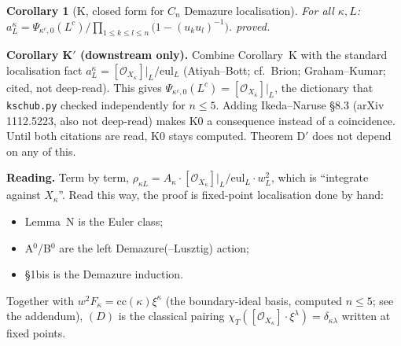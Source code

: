 \documentclass[11pt]{article}
\newcommand{\gr}[1]{\textsf{#1}}
\newcommand{\cc}{\mathrm{cc}}
\newcommand{\eul}{\mathrm{eul}}
\newcommand{\Oc}{\mathcal O}
\newtheorem{corollary}[theorem]{Corollary}
\theoremstyle{remark}
\begin{document}
\begin{corollary}[K, closed form for $C_n$ Demazure localisation]
For all $\kappa,L$: $a^\kappa_L=\Psi_{\kappa^c,0}(L^c)\big/\prod_{1\le k\le l\le n}\bigl(1-(u_ku_l)^{-1}\bigr)$.
\gr{proved}.
\end{corollary}

\textbf{Corollary K$'$ (downstream only).} Combine Corollary~K with the standard localisation fact
$a^\kappa_L=[\Oc_{X_\kappa}]|_L/\eul_L$ (Atiyah--Bott; cf.\ Brion; Graham--Kumar; cited, not deep-read). This gives
$\Psi_{\kappa^c,0}(L^c)=[\Oc_{X_\kappa}]|_L$, the dictionary that \texttt{kschub.py} checked independently for $n\le5$.
Adding Ikeda--Naruse \S8.3 (arXiv 1112.5223, also not deep-read) makes K0 a consequence instead of a coincidence.
Until both citations are read, K0 stays \gr{computed}. Theorem D$'$ does not depend on any of this.

\textbf{Reading.} Term by term, $\rho_{\kappa L}=A_\kappa\cdot[\Oc_{X_\kappa}]|_L/\eul_L\cdot w_L^2$, which is
``integrate against $X_\kappa$''. Read this way, the proof is fixed-point localisation done by hand:
\begin{itemize}[leftmargin=*,itemsep=1pt]
\item Lemma~N is the Euler class;
\item A$^0$/B$^0$ are the left Demazure(--Lusztig) action;
\item \S1bis is the Demazure induction.
\end{itemize}
Together with $w^2F_\kappa=\cc(\kappa)\xi^\kappa$ (the boundary-ideal basis, \gr{computed} $n\le5$; see the addendum),
$(D)$ is the classical pairing $\chi_T([\Oc_{X_\kappa}]\cdot\xi^\lambda)=\delta_{\kappa\lambda}$ written at fixed points.
\end{document}
